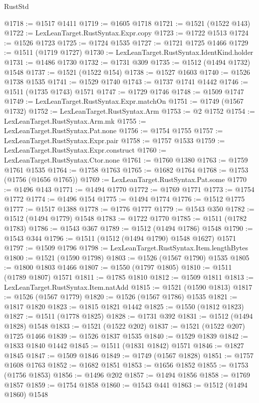 \begin{lexlean}{RustStd}
\begin{coremodule}
{{@1718 := @1517 @1411
@1719 := @1605 @1718
@1721 := @1521 (@1522 @143)
@1722 := LexLeanTarget.RustSyntax.Expr.copy
@1723 := @1722 @1513
@1724 := @1526 @1723
@1725 := @1724 @1535
@1727 := @1721 @1725 @1466
@1729 := @1511 (@1719 @1727)
@1730 := LexLeanTarget.RustSyntax.IdentKind.holder
@1731 := @1486 @1730
@1732 := @1731 @309
@1735 := @1512 (@1494 @1732) @1548
@1737 := @1521 (@1522 @154)
@1738 := @1527 @1603
@1740 := @1526 @1738 @1535
@1741 := @1529 @1740
@1743 := @1737 @1741 @1442
@1746 := @1511 (@1735 @1743) @1571
@1747 := @1729 @1746
@1748 := @1509 @1747
@1749 := LexLeanTarget.RustSyntax.Expr.matchOn
@1751 := @1749 (@1567 @1732)
@1752 := LexLeanTarget.RustSyntax.Arm
@1753 := @2 @1752
@1754 := LexLeanTarget.RustSyntax.Arm.mk
@1755 := LexLeanTarget.RustSyntax.Pat.none
@1756 := @1754 @1755
@1757 := LexLeanTarget.RustSyntax.Expr.pair
@1758 := @1757 @1533
@1759 := LexLeanTarget.RustSyntax.Expr.construct
@1760 := LexLeanTarget.RustSyntax.Ctor.none
@1761 := @1760 @1380
@1763 := @1759 @1761 @1535
@1764 := @1758 @1763
@1765 := @1682 @1764
@1768 := @1753 (@1756 (@1656 @1765))
@1769 := LexLeanTarget.RustSyntax.Pat.some
@1770 := @1496 @143
@1771 := @1494 @1770
@1772 := @1769 @1771
@1773 := @1754 @1772
@1774 := @1496 @154
@1775 := @1494 @1774
@1776 := @1512 @1775
@1777 := @1517 @1388
@1778 := @1776 @1777
@1779 := @1543 @350
@1782 := @1512 (@1494 @1779) @1548
@1783 := @1722 @1770
@1785 := @1511 (@1782 @1783)
@1786 := @1543 @367
@1789 := @1512 (@1494 @1786) @1548
@1790 := @1543 @344
@1796 := @1511 (@1512 (@1494 @1790) @1548 @1627) @1571
@1797 := @1509 @1796
@1798 := LexLeanTarget.RustSyntax.Item.lengthBytes
@1800 := @1521 (@1590 @1798)
@1803 := @1526 (@1567 @1790) @1535
@1805 := @1800 @1803 @1466
@1807 := @1550 (@1797 @1805)
@1810 := @1511 (@1789 @1807) @1571
@1811 := @1785 @1810
@1812 := @1509 @1811
@1813 := LexLeanTarget.RustSyntax.Item.natAdd
@1815 := @1521 (@1590 @1813)
@1817 := @1526 (@1567 @1779)
@1820 := @1526 (@1567 @1786) @1535
@1821 := @1817 @1820
@1823 := @1815 @1821 @1442
@1825 := @1550 (@1812 @1823)
@1827 := @1511 (@1778 @1825)
@1828 := @1731 @392
@1831 := @1512 (@1494 @1828) @1548
@1833 := @1521 (@1522 @202)
@1837 := @1521 (@1522 @207) @1725 @1466
@1839 := @1526 @1837 @1535
@1840 := @1529 @1839
@1842 := @1833 @1840 @1442
@1845 := @1511 (@1831 @1842) @1571
@1846 := @1827 @1845
@1847 := @1509 @1846
@1849 := @1749 (@1567 @1828)
@1851 := @1757 @1608 @1763
@1852 := @1682 @1851
@1853 := @1656 @1852
@1855 := @1753 (@1756 @1853)
@1856 := @1496 @202
@1857 := @1494 @1856
@1858 := @1769 @1857
@1859 := @1754 @1858
@1860 := @1543 @441
@1863 := @1512 (@1494 @1860) @1548
}}
\end{coremodule}
\end{lexlean}
